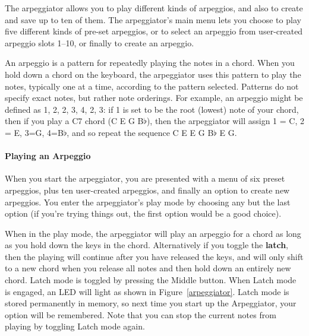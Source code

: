 \documentclass{article}
\begin{document}
The arpeggiator allows you to play different kinds of arpeggios, and also to create and save up to ten of them.  The arpeggiator's main menu lets you choose to play five different kinds of pre-set arpeggios, or to select an arpeggio from user-created arpeggio slots 1--10, or finally to create an arpeggio.

An arpeggio is a pattern for repeatedly playing the notes in a chord.  When you hold down a chord on the keyboard, the arpeggiator uses this pattern to play the notes, typically one at a time, according to the pattern selected.  Patterns do not specify exact notes, but rather note orderings.  For example, an arpeggio might be defined as 1, 2, 2, 3, 4, 2, 3: if 1 is set to be the root (lowest) note of your chord, then if you play a C7 chord (C E G B$\flat$), then the arpeggiator will assign 1 = C, 2 = E, 3=G, 4=B$\flat$, and so repeat the sequence C E E G B$\flat$ E G.   

\paragraph{Playing an Arpeggio}

When you start the arpeggiator, you are presented with a menu of six preset arpeggios, plus ten user-created arpeggios, and finally an option to create new arpeggios.  You enter the arpeggiator's play mode by choosing any but the last option (if you're trying things out, the first option would be a good choice).

When in the play mode, the arpeggiator will play an arpeggio for a chord as long as you hold down the keys in the chord.  Alternatively if you toggle the {\bf latch}, then the playing will continue after you have released the keys, and will only shift to a new chord when you release all notes and then hold down an entirely new chord.  Latch mode is toggled by pressing the Middle button.  When Latch mode is engaged, an LED will light as shown in Figure~\ref{arpeggiator}.  Latch mode is stored permanently in memory, so next time you start up the Arpeggiator, your option will be remembered.  Note that you can stop the current notes from playing by toggling Latch mode again.
\end{document}
